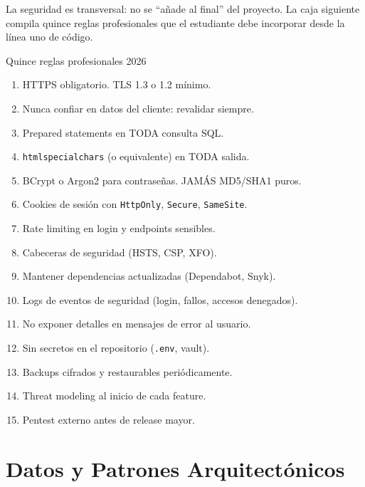 \documentclass[11pt,a4paper,openany]{book}
\begin{document}
La seguridad es transversal: no se ``añade al final'' del
proyecto. La caja siguiente compila quince reglas profesionales que
el estudiante debe incorporar desde la línea uno de código.


\begin{cajabuenas}{Quince reglas profesionales 2026}
\begin{enumerate}
\item HTTPS obligatorio. TLS 1.3 o 1.2 mínimo.
\item Nunca confiar en datos del cliente: revalidar siempre.
\item Prepared statements en TODA consulta SQL.
\item \texttt{htmlspecialchars} (o equivalente) en TODA salida.
\item BCrypt o Argon2 para contraseñas. JAMÁS MD5/SHA1 puros.
\item Cookies de sesión con \texttt{HttpOnly}, \texttt{Secure},
\texttt{SameSite}.
\item Rate limiting en login y endpoints sensibles.
\item Cabeceras de seguridad (HSTS, CSP, XFO).
\item Mantener dependencias actualizadas (Dependabot, Snyk).
\item Logs de eventos de seguridad (login, fallos, accesos
denegados).
\item No exponer detalles en mensajes de error al usuario.
\item Sin secretos en el repositorio (\texttt{.env}, vault).
\item Backups cifrados y restaurables periódicamente.
\item Threat modeling al inicio de cada feature.
\item Pentest externo antes de release mayor.
\end{enumerate}
\end{cajabuenas}


\part{Datos y Patrones Arquitectónicos}
\label{parte:unidad3}

\setcounter{chapter}{9}
\end{document}
